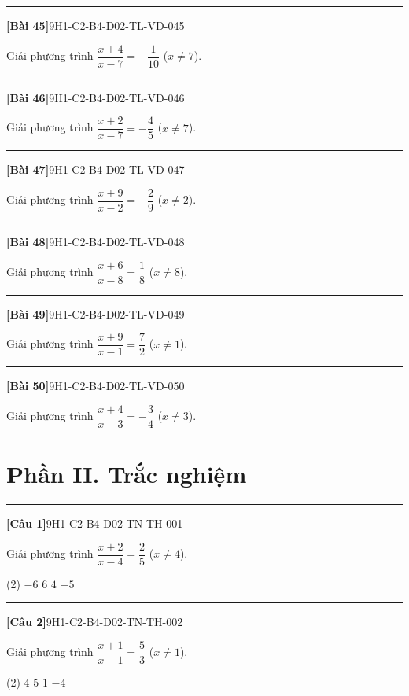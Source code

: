 \documentclass[12pt,a4paper]{article}
\newif\ifloigiai
\newenvironment{cauhoi}[2]{%
  \par\medskip\noindent\rule{\textwidth}{0.4pt}\par\nopagebreak
  \noindent\textbf{[#1]}\hfill{\scriptsize\ttfamily #2}\par\nopagebreak\smallskip}{\par}
\newcommand{\loigiai}[1]{\ifloigiai\par\smallskip\noindent\textit{Lời giải.} #1\par\fi}
\newcommand{\dapan}[1]{\ifloigiai\par\smallskip\noindent\textit{Đáp án:} \textbf{#1}\par\fi}
\begin{document}
\begin{cauhoi}{Bài 45}{9H1-C2-B4-D02-TL-VD-045}
Giải phương trình $\dfrac{x+4}{x-7}=-\dfrac{1}{10}$ ($x\ne 7$).
\loigiai{Điều kiện $x\ne 7$. Nhân hai vế với $x-7$: $x+4=-\dfrac{1}{10}(x-7)$. Giải ta được $x=-3$ (thoả điều kiện).}
\end{cauhoi}
\begin{cauhoi}{Bài 46}{9H1-C2-B4-D02-TL-VD-046}
Giải phương trình $\dfrac{x+2}{x-7}=-\dfrac{4}{5}$ ($x\ne 7$).
\loigiai{Điều kiện $x\ne 7$. Nhân hai vế với $x-7$: $x+2=-\dfrac{4}{5}(x-7)$. Giải ta được $x=2$ (thoả điều kiện).}
\end{cauhoi}
\begin{cauhoi}{Bài 47}{9H1-C2-B4-D02-TL-VD-047}
Giải phương trình $\dfrac{x+9}{x-2}=-\dfrac{2}{9}$ ($x\ne 2$).
\loigiai{Điều kiện $x\ne 2$. Nhân hai vế với $x-2$: $x+9=-\dfrac{2}{9}(x-2)$. Giải ta được $x=-7$ (thoả điều kiện).}
\end{cauhoi}
\begin{cauhoi}{Bài 48}{9H1-C2-B4-D02-TL-VD-048}
Giải phương trình $\dfrac{x+6}{x-8}=\dfrac{1}{8}$ ($x\ne 8$).
\loigiai{Điều kiện $x\ne 8$. Nhân hai vế với $x-8$: $x+6=\dfrac{1}{8}(x-8)$. Giải ta được $x=-8$ (thoả điều kiện).}
\end{cauhoi}
\begin{cauhoi}{Bài 49}{9H1-C2-B4-D02-TL-VD-049}
Giải phương trình $\dfrac{x+9}{x-1}=\dfrac{7}{2}$ ($x\ne 1$).
\loigiai{Điều kiện $x\ne 1$. Nhân hai vế với $x-1$: $x+9=\dfrac{7}{2}(x-1)$. Giải ta được $x=5$ (thoả điều kiện).}
\end{cauhoi}
\begin{cauhoi}{Bài 50}{9H1-C2-B4-D02-TL-VD-050}
Giải phương trình $\dfrac{x+4}{x-3}=-\dfrac{3}{4}$ ($x\ne 3$).
\loigiai{Điều kiện $x\ne 3$. Nhân hai vế với $x-3$: $x+4=-\dfrac{3}{4}(x-3)$. Giải ta được $x=-1$ (thoả điều kiện).}
\end{cauhoi}
\clearpage\section*{Phần II. Trắc nghiệm}
\begin{cauhoi}{Câu 1}{9H1-C2-B4-D02-TN-TH-001}
Giải phương trình $\dfrac{x+2}{x-4}=\dfrac{2}{5}$ ($x\ne 4$).
\begin{tasks}(2)
\task $-6$
\task $6$
\task $4$
\task $-5$
\end{tasks}
\dapan{A}
\end{cauhoi}
\begin{cauhoi}{Câu 2}{9H1-C2-B4-D02-TN-TH-002}
Giải phương trình $\dfrac{x+1}{x-1}=\dfrac{5}{3}$ ($x\ne 1$).
\begin{tasks}(2)
\task $4$
\task $5$
\task $1$
\task $-4$
\end{tasks}
\dapan{A}
\end{cauhoi}
\end{document}
